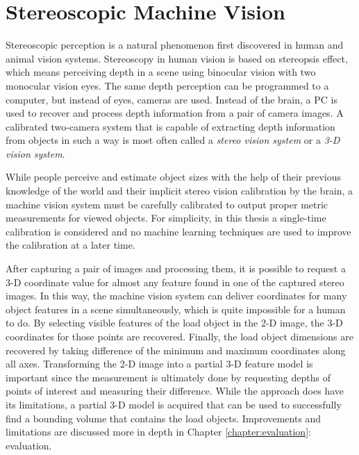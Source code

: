 \documentclass[12pt,a4paper,oneside,pdftex]{report}
\begin{document}
    

\chapter{Stereoscopic Machine Vision}
\label{chapter:stereoscopic_machine_vision}
Stereoscopic perception is a natural phenomenon first discovered in human and animal vision systems. Stereoscopy in human vision is based on stereopsis effect, which means perceiving depth in a scene using binocular vision with two monocular vision eyes. The same depth perception can be programmed to a computer, but instead of eyes, cameras are used. Instead of the brain, a PC is used to recover and process depth information from a pair of camera images. A calibrated two-camera system that is capable of extracting depth information from objects in such a way is most often called a \emph{stereo vision system} or a \emph{3-D vision system}.

While people perceive and estimate object sizes with the help of their previous knowledge of the world and their implicit stereo vision calibration by the brain, a machine vision system must be carefully calibrated to output proper metric measurements for viewed objects. For simplicity, in this thesis a single-time calibration is considered and no machine learning techniques are used to improve the calibration at a later time.

After capturing a pair of images and processing them, it is possible to request a 3-D coordinate value for almost any feature found in one of the captured stereo images. In this way, the machine vision system can deliver coordinates for many object features in a scene simultaneously, which is quite impossible for a human to do. By selecting visible features of the load object in the 2-D image, the 3-D coordinates for those points are recovered. Finally, the load object dimensions are recovered by taking difference of the minimum and maximum coordinates along all axes. Transforming the 2-D image into a partial 3-D feature model is important since the measurement is ultimately done by requesting depths of points of interest and measuring their difference. While the approach does have its limitations, a partial 3-D model is acquired that can be used to successfully find a bounding volume that contains the load objects. Improvements and limitations are discussed more in depth in Chapter \ref{chapter:evaluation}: evaluation.
\end{document}

